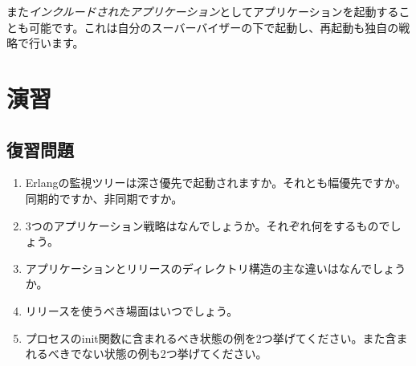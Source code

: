 また\emph{インクルードされたアプリケーション}としてアプリケーションを起動することも可能です。これは自分のスーバーバイザーの下で起動し、再起動も独自の戦略で行います。

\section{演習}

\subsection*{復習問題}

\begin{enumerate}
  \item Erlangの監視ツリーは深さ優先で起動されますか。それとも幅優先ですか。同期的ですか、非同期ですか。
  \item 3つのアプリケーション戦略はなんでしょうか。それぞれ何をするものでしょう。
  \item アプリケーションとリリースのディレクトリ構造の主な違いはなんでしょうか。
  \item リリースを使うべき場面はいつでしょう。
  \item プロセスのinit関数に含まれるべき状態の例を2つ挙げてください。また含まれるべきでない状態の例も2つ挙げてください。
\end{enumerate}

